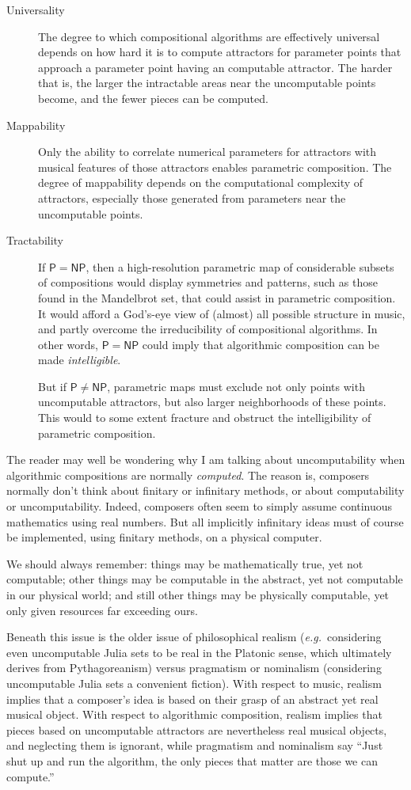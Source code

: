 \documentclass[]{interact}
\theoremstyle{plain}%
\theoremstyle{definition}
\theoremstyle{remark}
\begin{document}
\begin{description}
\item[Universality] The degree to which compositional algorithms are effectively universal depends on how hard it is to compute attractors for parameter points that approach a parameter point having an computable attractor. The harder that is, the larger the intractable areas near the uncomputable points become, and the fewer pieces can be computed.
\item[Mappability] Only the ability to correlate numerical parameters for attractors with musical features of those attractors enables parametric composition. The degree of mappability depends on the computational complexity of attractors, especially those generated from parameters near the uncomputable points.
\item[Tractability] If $\mathsf{P} = \mathsf{NP}$, then a high-resolution parametric map of considerable subsets of compositions would display symmetries and patterns, such as those found in the Mandelbrot set, that could assist in parametric composition. It would afford a God's-eye view of (almost) all possible structure in music, and partly overcome the irreducibility of compositional algorithms. In other words, $\mathsf{P} = \mathsf{NP}$ could imply that algorithmic composition can be made \emph{intelligible}.

But if $\mathsf{P} \ne \mathsf{NP}$, parametric maps must exclude not only points with uncomputable attractors, but also larger neighborhoods of these points. This would to some extent fracture and obstruct the intelligibility of parametric composition.
\end{description}

The reader may well be wondering why I am talking about uncomputability when algorithmic compositions are normally \emph{computed}. The reason is, composers normally don't think about finitary or infinitary methods, or about computability or uncomputability. Indeed, composers often seem to simply assume continuous mathematics using real numbers. But all implicitly infinitary ideas must of course be implemented, using finitary methods, on a physical computer. 

We should always remember: things may be mathematically true, yet not computable; other things may be computable in the abstract, yet not computable in our physical world; and still other things may be physically computable, yet only given resources far exceeding ours. 

Beneath this issue is the older issue of philosophical realism (\emph{e.g.}\ considering even uncomputable Julia sets to be real in the Platonic sense, which ultimately derives from Pythagoreanism) versus pragmatism or nominalism (considering uncomputable Julia sets a convenient fiction). With respect to music, realism implies that a composer's idea is based on their grasp of an abstract yet real musical object. With respect to algorithmic composition, realism implies that pieces based on uncomputable attractors are nevertheless real musical objects, and neglecting them is ignorant, while pragmatism and nominalism say ``Just shut up and run the algorithm, the only pieces that matter are those we can compute.''
\end{document}
